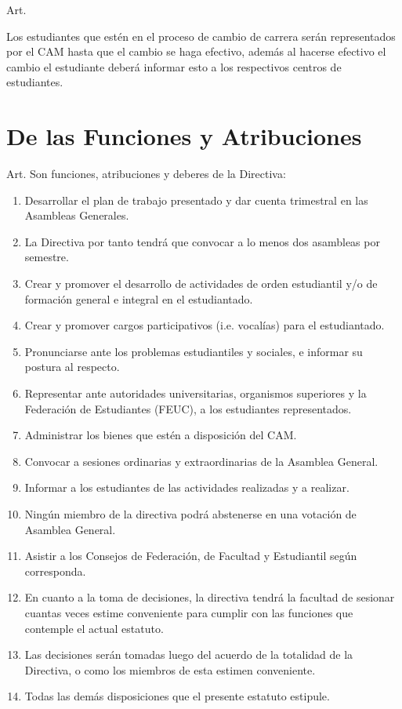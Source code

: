 \documentclass[letterpaper,11pt]{article}
\newcounter{art}
\newenvironment{art}{
    Art.\refstepcounter{art} \theart\:
}{}
\begin{document}
\begin{art}
	Los estudiantes que estén en el proceso de cambio de carrera serán representados por el CAM hasta que el cambio se haga efectivo, además al hacerse efectivo el cambio el estudiante deberá informar esto a los respectivos centros de estudiantes.
\end{art}

\section{De las Funciones y Atribuciones}\label{funcionesAtribuciones}
\begin{art}\label{funcionesDirectiva}
	Son funciones, atribuciones y deberes de la Directiva:
	\begin{enumerate}
		\item Desarrollar el plan de trabajo presentado y dar cuenta trimestral en las Asambleas Generales.
		\item La Directiva por tanto tendrá que convocar a lo menos dos asambleas por semestre.
		\item Crear y promover el desarrollo de actividades de orden estudiantil y/o de formación general e integral en el estudiantado.
		\item Crear y promover cargos participativos (i.e. vocalías) para el estudiantado.%
		\item Pronunciarse ante los problemas estudiantiles y sociales, e informar su postura al respecto. %
		\item Representar ante autoridades universitarias, organismos superiores y la Federación de Estudiantes (FEUC), a los estudiantes representados.
		\item Administrar los bienes que estén a disposición del CAM.
		\item Convocar a sesiones ordinarias y extraordinarias de la Asamblea General. %
		\item Informar a los estudiantes de las actividades realizadas y a realizar.
		\item Ningún miembro de la directiva podrá abstenerse en una votación de Asamblea General.
		\item Asistir a los Consejos de Federación, de Facultad y Estudiantil según corresponda.
		\item En cuanto a la toma de decisiones, la directiva tendrá la facultad de sesionar cuantas veces estime conveniente para cumplir con las funciones que contemple el actual estatuto.
		\item Las decisiones serán tomadas luego del acuerdo de la totalidad de la Directiva, o como los miembros de esta estimen conveniente.
		\item Todas las demás disposiciones que el presente estatuto estipule.
	\end{enumerate}
\end{art}
\end{document}
